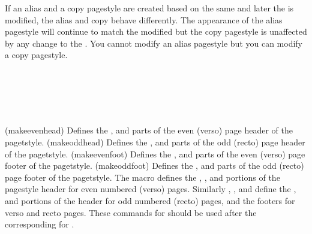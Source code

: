     If an alias and a copy pagestyle are created based on the same 
 and later the  is modified, 
the alias and copy behave differently.
The appearance of the alias pagestyle will continue to match the
modified  but the copy pagestyle is unaffected by any change
to the . You cannot modify an alias pagestyle but you can
modify a copy pagestyle.

\begin{syntax}
\cmd{\makeevenhead} \\
\cmd{\makeoddhead} \\
\cmd{\makeevenfoot} \\
\cmd{\makeoddfoot} \\
\end{syntax}
\glossary(makeevenhead)%
  {}%
  {Defines the ,  and  parts of the
   even (verso) page header of the  pagetstyle.}
\glossary(makeoddhead)%
  {}%
  {Defines the ,  and  parts of the
   odd (recto) page header of the  pagetstyle.}
\glossary(makeevenfoot)%
  {}%
  {Defines the ,  and  parts of the
   even (verso) page footer of the  pagetstyle.}
\glossary(makeoddfoot)%
  {}%
  {Defines the ,  and  parts of the
   odd (recto) page footer of the  pagetstyle.}
The macro \cmd{\makeevenhead} defines the , , and
 portions of the  pagestyle header 
for even numbered (verso) pages. 
Similarly \cmd{\makeoddhead}, \cmd{\makeevenfoot}, and
\cmd{\makeoddfoot} define the ,  and 
portions of the  header for odd numbered 
(recto) pages, and the footers for verso and recto pages. 
These commands for 
should be used after the corresponding \cmd{\makepagestyle} for .

